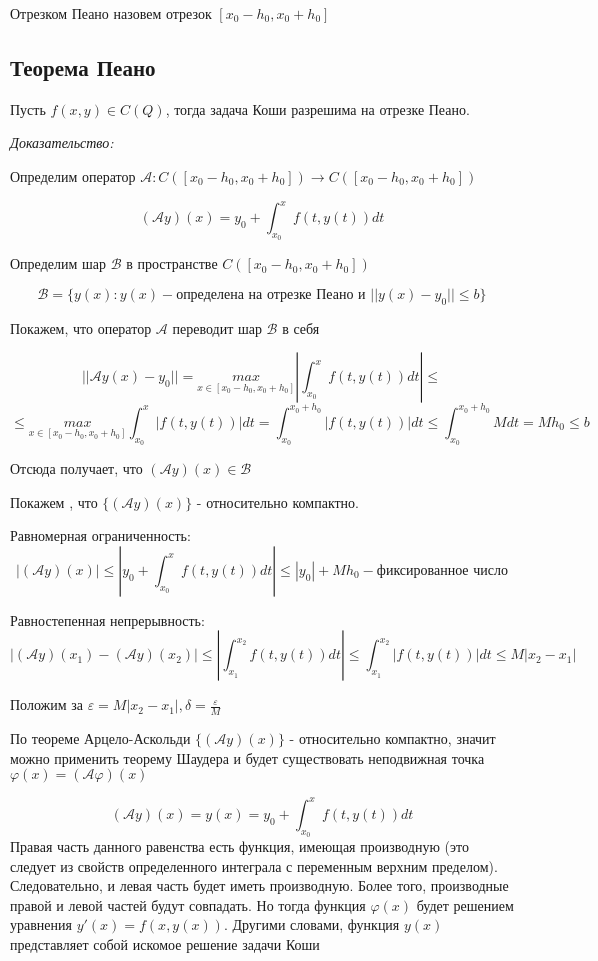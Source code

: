 \documentclass[12pt]{article}
\begin{document}
Отрезком Пеано назовем отрезок $[x_0 - h_0, x_0 + h_0]$
\subsection{Теорема Пеано} Пусть $f(x,y) \in C(Q)$, тогда задача Коши разрешима на отрезке Пеано.

\textit{Доказательство:}

	Определим оператор $\mathcal{A}: C([x_0 - h_0, x_0 + h_0]) \to  C([x_0 - h_0, x_0 + h_0])$ 
	
	$$(\mathcal{A}y)(x) = y_0 + \int_{x_0}^x f(t,y(t))dt$$
	
	Определим шар $\mathcal{B}$ в пространстве $C([x_0 - h_0, x_0 + h_0])$
	
	 $$\mathcal{B} = \{ y(x) : y(x) - \text{определена на отрезке Пеано и } ||y(x) - y_0|| \le b \}$$

	Покажем, что оператор $\mathcal{A}$ переводит шар $\mathcal{B}$ в себя
	
	$$||\mathcal{A}y(x) - y_0|| =  \underset{x \in [x_0 - h_0, x_0 + h_0]} {max} |\int_{x_0}^x f(t,y(t))dt| \le$$
	$$\le \underset{x \in [x_0 - h_0, x_0 + h_0]} {max} \int_{x_0}^x |f(t,y(t))|dt = \int_{x_0}^{x_0 + h_0} |f(t,y(t))|dt \le \int_{x_0}^{x_0 + h_0} Mdt = Mh_0 \le b $$
	
	
	Отсюда получает, что $(\mathcal{A}y)(x) \in \mathcal{B}$
	
	Покажем , что $\{ (\mathcal{A}y)(x) \}$ - относительно компактно.
	
	Равномерная ограниченность:
	$$|(\mathcal{A}y)(x)| \le |y_0 + \int_{x_0}^x f(t,y(t))dt| \le |y_0| + Mh_0 - \text{фиксированное число}$$
	
	Равностепенная непрерывность:
	$$|(\mathcal{A}y)(x_1) - (\mathcal{A}y)(x_2)| \le |\int_{x_1}^{x_2} f(t,y(t))dt| \le \int_{x_1}^{x_2} |f(t,y(t))|dt \le M|x_2 - x_1|$$
	
	Положим за $\varepsilon = M|x_2 - x_1|, \delta = \frac{\varepsilon}{M}$
	
	По теореме Арцело-Аскольди $\{ (\mathcal{A}y)(x) \}$ - относительно компактно, значит можно применить теорему Шаудера и будет существовать неподвижная точка $\varphi(x) = (\mathcal{A}\varphi)(x)$
	
	
	$$(\mathcal{A}y)(x) = y(x) = y_0 + \int_{x_0}^x f(t,y(t))dt$$
	Правая часть данного равенства есть функция, имеющая производную (это
следует из свойств определенного интеграла с переменным верхним пределом). Следовательно, и левая часть будет иметь производную. Более того, производные правой и левой частей будут совпадать. Но тогда функция $\varphi(x)$ будет решением уравнения 
$y'(x) = f(x, y(x))$. Другими словами, функция $y(x)$ представляет собой искомое решение задачи Коши
	
\end{document}
